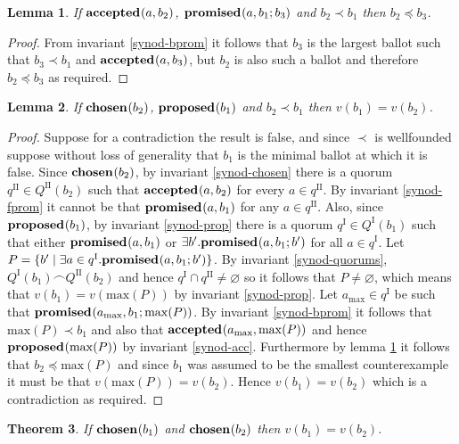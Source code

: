 \documentclass[journal]{IEEEtran}
\newtheorem{theorem}{Theorem}
\newtheorem{lemma}[theorem]{Lemma}
\begin{document}
\begin{lemma}\label{synod-acc-bprom}If $\mathbf{accepted}_{}(a,b_2)$,
$\mathbf{promised}_{}(a,b_1;b_3)$ and $b_2 \prec b_1$ then $b_2 \preceq b_3$.\end{lemma}

\begin{proof} From invariant \ref{synod-bprom} it follows that $b_3$ is the
largest ballot such that $b_3 \prec b_1$ and $\mathbf{accepted}_{}(a,b_3)$, but $b_2$ is
also such a ballot and therefore $b_2 \preceq b_3$ as required.  \end{proof}

\begin{lemma}\label{synod-lemma} If $\mathbf{chosen}_{}(b_2)$, $\mathbf{proposed}_{}(b_1)$ and $b_2
\prec b_1$ then $v(b_1) = v(b_2)$. \end{lemma}

\begin{proof}Suppose for a contradiction the result is false, and since $\prec$
is wellfounded suppose without loss of generality that $b_1$ is the minimal
ballot at which it is false.  Since $\mathbf{chosen}_{}(b_2)$, by invariant
\ref{synod-chosen} there is a quorum $q^\textrm{II} \in Q^\textrm{II}(b_2)$
such that $\mathbf{accepted}_{}(a,b_2)$ for every $a \in q^\textrm{II}$.  By invariant
\ref{synod-fprom} it cannot be that $\mathbf{promised}_{}(a,b_1)$ for any $a \in
q^\textrm{II}$.  Also, since $\mathbf{proposed}_{}(b_1)$, by invariant \ref{synod-prop}
there is a quorum $q^\textrm{I} \in Q^\textrm{I}(b_1)$ such that either
$\mathbf{promised}_{}(a,b_1)$ or $\exists b'.  \mathbf{promised}_{}(a,b_1;b')$ for all $a \in
q^\textrm{I}$.  Let $P = \{ b' \mid \exists a \in q^\textrm{I}.
\mathbf{promised}_{}(a,b_1;b') \}$.  By invariant \ref{synod-quorums},
${Q^\textrm{I}(b_1) \frown Q^\textrm{II}(b_2)}$ and hence $q^\textrm{I} \cap
q^\textrm{II} \ne \varnothing$ so it follows that $P \ne \varnothing$, which
means that $v(b_1) = v(\mathrm{max}(P))$ by invariant \ref{synod-prop}. Let
$a_{\mathrm{max}} \in q^\textrm{I}$ be such that
$\mathbf{promised}_{}(a_{\mathrm{max}},b_1;\mathrm{max}(P))$.  By invariant
\ref{synod-bprom} it follows that $\mathrm{max}(P) \prec b_1$ and also that
$\mathbf{accepted}_{}(a_{\mathrm{max}},\mathrm{max}(P))$ and hence
$\mathbf{proposed}_{}(\mathrm{max}(P))$ by invariant \ref{synod-acc}. Furthermore by lemma
\ref{synod-acc-bprom} it follows that $b_2 \preceq \mathrm{max}(P)$ and since
$b_1$ was assumed to be the smallest counterexample it must be that
$v(\mathrm{max}(P)) = v(b_2)$.  Hence $v(b_1) = v(b_2)$ which is a
contradiction as required.  \end{proof}

\begin{theorem}\label{synod-safety-theorem} If $\mathbf{chosen}_{}(b_1)$ and
$\mathbf{chosen}_{}(b_2)$ then $v(b_1) = v(b_2)$.  \end{theorem}
\end{document}
